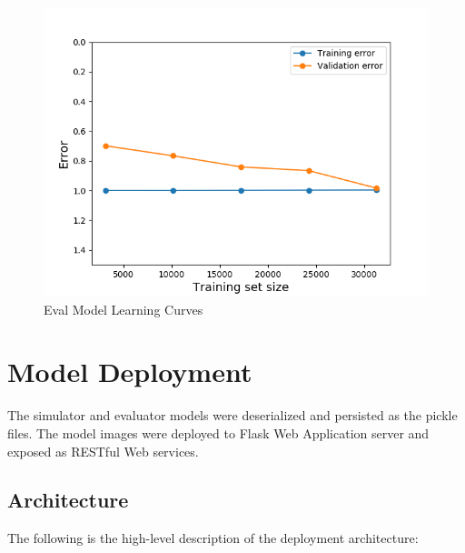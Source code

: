 \begin{Schunk}
\begin{figure}[H]

{\centering \includegraphics[width=0.9\linewidth]{../../models/training/evaluator_rf_tuned_large_curves} 

}

\caption[Eval Model Learning Curves]{Eval Model Learning Curves}\label{fig:evaluator_lc}
\end{figure}
\end{Schunk}

\hypertarget{model-deployment}{%
\section{Model Deployment}\label{model-deployment}}

The simulator and evaluator models were deserialized and persisted as
the pickle files. The model images were deployed to Flask Web
Application server and exposed as RESTful Web services.

\hypertarget{architecture}{%
\subsection{Architecture}\label{architecture}}

The following is the high-level description of the deployment
architecture:

